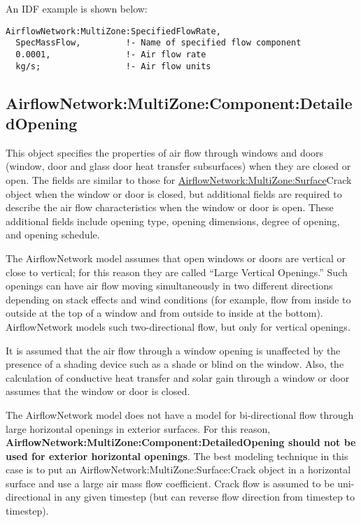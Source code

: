 An IDF example is shown below:

\begin{lstlisting}
AirflowNetwork:MultiZone:SpecifiedFlowRate,
  SpecMassFlow,         !- Name of specified flow component
  0.0001,               !- Air flow rate
  kg/s;                 !- Air flow units
\end{lstlisting}

\subsection{AirflowNetwork:MultiZone:Component:DetailedOpening}\label{airflownetworkmultizonecomponentdetailedopening}

This object specifies the properties of air flow through windows and doors (window, door and glass door heat transfer subsurfaces) when they are closed or open. The fields are similar to those for \hyperref[airflownetworkmultizonesurface]{AirflowNetwork:MultiZone:Surface}Crack object when the window or door is closed, but additional fields are required to describe the air flow characteristics when the window or door is open. These additional fields include opening type, opening dimensions, degree of opening, and opening schedule.

The AirflowNetwork model assumes that open windows or doors are vertical or close to vertical; for this reason they are called ``Large Vertical Openings.'' Such openings can have air flow moving simultaneously in two different directions depending on stack effects and wind conditions (for example, flow from inside to outside at the top of a window and from outside to inside at the bottom). AirflowNetwork models such two-directional flow, but only for vertical openings.

It is assumed that the air flow through a window opening is unaffected by the presence of a shading device such as a shade or blind on the window. Also, the calculation of conductive heat transfer and solar gain through a window or door assumes that the window or door is closed.

The AirflowNetwork model does not have a model for bi-directional flow through large horizontal openings in exterior surfaces. For this reason, \textbf{Air\-flow\-Net\-work:\-Multi\-Zone:\-Component:\-Detailed\-Opening should not be used for exterior horizontal openings}. The best modeling technique in this case is to put an Air\-flow\-Net\-work:\-Multi\-Zone:\-Sur\-face:\-Crack object in a horizontal surface and use a large air mass flow coefficient. Crack flow is assumed to be uni-directional in any given timestep (but can reverse flow direction from timestep to timestep).

